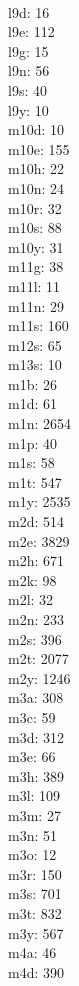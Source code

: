 \begin{multicols}{8}
  \\l9d: 16
  \\l9e: 112
  \\l9g: 15
  \\l9n: 56
  \\l9s: 40
  \\l9y: 10
  \\m10d: 10
  \\m10e: 155
  \\m10h: 22
  \\m10n: 24
  \\m10r: 32
  \\m10s: 88
  \\m10y: 31
  \\m11g: 38
  \\m11l: 11
  \\m11n: 29
  \\m11s: 160
  \\m12s: 65
  \\m13s: 10
  \\m1b: 26
  \\m1d: 61
  \\m1n: 2654
  \\m1p: 40
  \\m1s: 58
  \\m1t: 547
  \\m1y: 2535
  \\m2d: 514
  \\m2e: 3829
  \\m2h: 671
  \\m2k: 98
  \\m2l: 32
  \\m2n: 233
  \\m2s: 396
  \\m2t: 2077
  \\m2y: 1246
  \\m3a: 308
  \\m3c: 59
  \\m3d: 312
  \\m3e: 66
  \\m3h: 389
  \\m3l: 109
  \\m3m: 27
  \\m3n: 51
  \\m3o: 12
  \\m3r: 150
  \\m3s: 701
  \\m3t: 832
  \\m3y: 567
  \\m4a: 46
  \\m4d: 390

\end{multicols}
